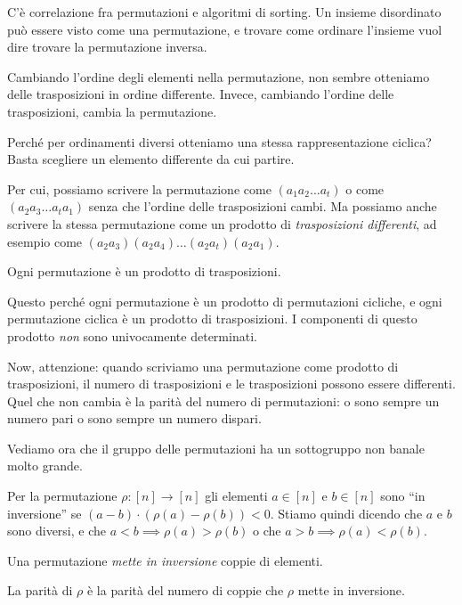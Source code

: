 C'\`e correlazione fra permutazioni e algoritmi di sorting.
Un insieme disordinato pu\`o essere visto come una permutazione, e trovare come ordinare l'insieme vuol dire trovare la permutazione inversa.

Cambiando l'ordine degli elementi nella permutazione, non sembre otteniamo delle trasposizioni in ordine differente.
Invece, cambiando l'ordine delle trasposizioni, cambia la permutazione.

Perch\'e per ordinamenti diversi otteniamo una stessa rappresentazione ciclica?
Basta scegliere un elemento differente da cui partire.

Per cui, possiamo scrivere la permutazione come $(a_1 a_2 \dots a_t)$ o come $(a_2 a_3 \dots a_t a_1)$ senza che l'ordine delle trasposizioni cambi.
Ma possiamo anche scrivere la stessa permutazione come un prodotto di \emph{trasposizioni differenti}, ad esempio come $(a_2 a_3) (a_2 a_4) \dots (a_2 a_t) (a_2 a_1)$.

\begin{prop}
	Ogni permutazione \`e un prodotto di trasposizioni.
\end{prop}

Questo perch\'e ogni permutazione \`e un prodotto di permutazioni cicliche, e ogni permutazione ciclica \`e un prodotto di trasposizioni.
I componenti di questo prodotto \emph{non} sono univocamente determinati.

Now, attenzione: quando scriviamo una permutazione come prodotto di trasposizioni, il numero di trasposizioni e le trasposizioni possono essere differenti.
Quel che non cambia \`e la parit\`a del numero di permutazioni: o sono sempre un numero pari o sono sempre un numero dispari.

Vediamo ora che il gruppo delle permutazioni ha un sottogruppo non banale molto grande.

\begin{defn}
	Per la permutazione $\rho : [n] \to [n]$ gli elementi $a \in [n]$ e $b \in [n]$ sono ``in inversione'' se $(a - b) \cdot (\rho(a) - \rho(b)) < 0$.
	Stiamo quindi dicendo che $a$ e $b$ sono diversi, e che $a < b \implies \rho(a) > \rho(b)$ o che $a > b \implies \rho(a) < \rho(b)$.
\end{defn}

Una permutazione \emph{mette in inversione} coppie di elementi.

\begin{defn}
	La parit\`a di $\rho$ \`e la parit\`a del numero di coppie che $\rho$ mette in inversione.
\end{defn}

